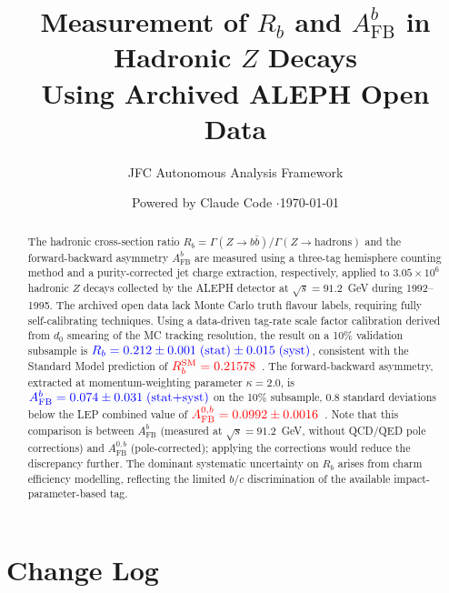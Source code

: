 \documentclass[11pt,a4paper]{article}
\title{Measurement of $R_b$ and $A_\text{FB}^b$ in Hadronic $Z$ Decays\\
Using Archived ALEPH Open Data}
\author{JFC Autonomous Analysis Framework}
\date{Powered by Claude Code \quad$\cdot$\quad \today}
\newcommand{\measured}[1]{\textcolor{blue}{#1}}
\newcommand{\external}[1]{\textcolor{red}{#1}}
\begin{document}
\maketitle

\begin{abstract}
The hadronic cross-section ratio
$R_b = \Gamma(Z \to b\bar{b}) / \Gamma(Z \to \text{hadrons})$
and the forward-backward asymmetry $A_\text{FB}^b$ are measured using
a three-tag hemisphere counting method and a purity-corrected jet
charge extraction, respectively, applied to $3.05 \times 10^6$
hadronic $Z$ decays collected by the ALEPH detector at
$\sqrt{s} = 91.2$~GeV during 1992--1995.
The archived open data lack Monte Carlo truth flavour labels,
requiring fully self-calibrating techniques.
Using a data-driven tag-rate scale factor calibration derived from
$d_0$ smearing of the MC tracking resolution, the result on a 10\%
validation subsample is
$\measured{R_b = 0.212 \pm 0.001\;\text{(stat)} \pm 0.015\;\text{(syst)}}$,
consistent with the Standard Model prediction of
$\external{R_b^\text{SM} = 0.21578}$~\cite{LEP:EWWG:2005}.
The forward-backward asymmetry, extracted at momentum-weighting
parameter $\kappa = 2.0$, is
$\measured{A_\text{FB}^b = 0.074 \pm 0.031\;\text{(stat+syst)}}$
on the 10\% subsample, $0.8$ standard deviations below the
LEP combined value of
$\external{A_\text{FB}^{0,b} = 0.0992 \pm 0.0016}$~\cite{LEP:EWWG:2005}.
Note that this comparison is between $A_\text{FB}^b$ (measured at $\sqrt{s} = 91.2$~GeV,
without QCD/QED pole corrections) and $A_\text{FB}^{0,b}$ (pole-corrected);
applying the corrections would reduce the discrepancy further.
The dominant systematic uncertainty on $R_b$ arises from charm
efficiency modelling, reflecting the limited $b$/$c$ discrimination
of the available impact-parameter-based tag.
\end{abstract}

\tableofcontents
\clearpage

\section*{Change Log}
\end{document}
